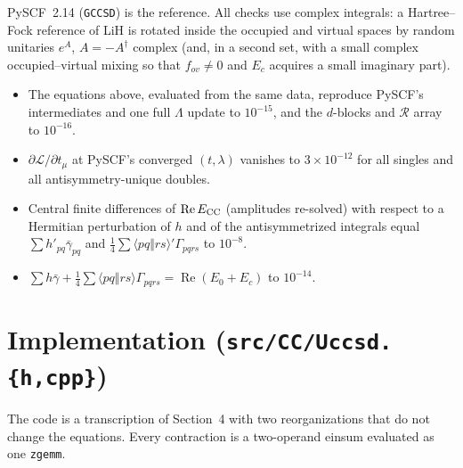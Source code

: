 \documentclass[11pt]{article}
\newcommand{\anti}[4]{\langle #1#2\Vert #3#4\rangle}
\begin{document}
PySCF~2.14 (\texttt{GCCSD}) is the reference. All checks use complex integrals: a Hartree--Fock reference of LiH is rotated
inside the occupied and virtual spaces by random unitaries $e^{A}$, $A=-A^\dagger$ complex (and, in a second set, with a
small complex occupied--virtual mixing so that $f_{ov}\neq0$ and $E_c$ acquires a small imaginary part).
\begin{itemize}
\item The equations above, evaluated from the same data, reproduce PySCF's intermediates and one full $\Lambda$ update
 to $10^{-15}$, and the $d$-blocks and $\mathcal R$ array to $10^{-16}$.
\item $\partial\mathcal L/\partial t_\mu$ at PySCF's converged $(t,\lambda)$ vanishes to $3\times10^{-12}$ for all singles and
 all antisymmetry-unique doubles.
\item Central finite differences of $\operatorname{Re}E_{\rm CC}$ (amplitudes re-solved) with respect to a Hermitian
 perturbation of $h$ and of the antisymmetrized integrals equal $\sum h'_{pq}\bar\gamma_{pq}$ and
 $\tfrac14\sum\anti{p}{q}{r}{s}'\Gamma_{pqrs}$ to $10^{-8}$.
\item $\sum h\bar\gamma+\tfrac14\sum\anti{p}{q}{r}{s}\Gamma_{pqrs}=\operatorname{Re}(E_0+E_c)$ to $10^{-14}$.
\end{itemize}

\section{Implementation (\texttt{src/CC/Uccsd.\{h,cpp\}})}
\label{sec:impl}

The code is a transcription of Section~4 with two reorganizations that do not change the equations. Every
contraction is a two-operand einsum evaluated as one \texttt{zgemm}.
\end{document}
